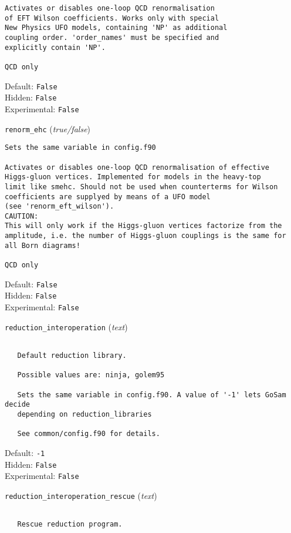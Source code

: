 \begin{basedescript}{\desclabelstyle{\pushlabel}}
\begin{verbatim}
Activates or disables one-loop QCD renormalisation
of EFT Wilson coefficients. Works only with special
New Physics UFO models, containing 'NP' as additional
coupling order. 'order_names' must be specified and
explicitly contain 'NP'.

QCD only
\end{verbatim}
Default: \verb|False|
\\Hidden: \verb|False|
\\Experimental: \verb|False|
\\\item[\colorbox{gray!30}{\texttt{renorm\_ehc}}] (\textit{true/false})
\begin{verbatim}
Sets the same variable in config.f90

Activates or disables one-loop QCD renormalisation of effective
Higgs-gluon vertices. Implemented for models in the heavy-top
limit like smehc. Should not be used when counterterms for Wilson
coefficients are supplyed by means of a UFO model
(see 'renorm_eft_wilson').
CAUTION:
This will only work if the Higgs-gluon vertices factorize from the
amplitude, i.e. the number of Higgs-gluon couplings is the same for
all Born diagrams!

QCD only
\end{verbatim}
Default: \verb|False|
\\Hidden: \verb|False|
\\Experimental: \verb|False|
\\\item[\colorbox{gray!30}{\texttt{reduction\_interoperation}}] (\textit{text})
\begin{verbatim}

   Default reduction library.

   Possible values are: ninja, golem95

   Sets the same variable in config.f90. A value of '-1' lets GoSam decide
   depending on reduction_libraries

   See common/config.f90 for details.
\end{verbatim}
Default: \verb|-1|
\\Hidden: \verb|False|
\\Experimental: \verb|False|
\\\item[\colorbox{gray!30}{\texttt{reduction\_interoperation\_rescue}}] (\textit{text})
\begin{verbatim}

   Rescue reduction program.


\end{verbatim}
\end{basedescript}

